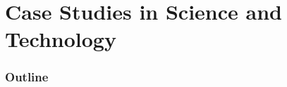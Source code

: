 \renewcommand{\thispart}{11 }
\renewcommand{\thispartname}{Case Studies in Science and Technology}

\part{\thispartname}

\section{Outline}



